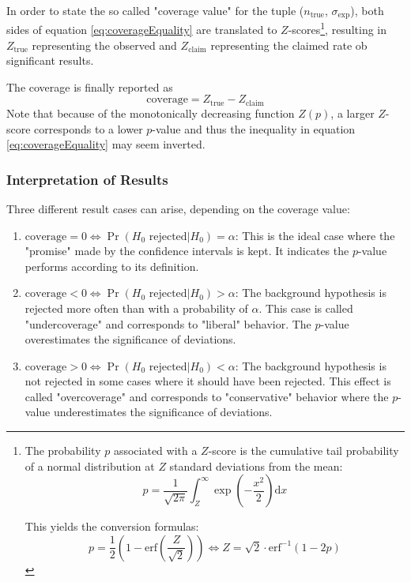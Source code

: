 In order to state the so called "coverage value" for the tuple ($n_\text{true}$, $\sigma_\text{exp}$), both sides of equation \ref{eq:coverageEquality} are translated to $Z$-scores\footnote{	
	The probability $p$ associated with a $Z$-score is the cumulative tail probability of a normal distribution at $Z$ standard deviations from the mean:
	\begin{equation}
	p = \frac{1}{\sqrt{2 \pi}}\int_Z^{\infty} \exp\left(-\frac{x^2}{2}\right) \text{d}x
	\end{equation}
	
	This yields the conversion formulas:
	\begin{equation}
	p = \frac{1}{2} \left(1 - \text{erf}\left(\frac{Z}{\sqrt{2}}\right) \right) \Leftrightarrow Z = \sqrt{2} \cdot \text{erf}^{-1} \left( 1 - 2 p \right) 
	\end{equation}
}, resulting in $Z_\text{true}$ representing the observed and $Z_\text{claim}$ representing the claimed rate ob significant results.

The coverage is finally reported as
\begin{equation}
	\text{coverage} = Z_\text{true} - Z_\text{claim}
\end{equation}
Note that because of the monotonically decreasing function $Z(p)$, a larger $Z$-score corresponds to a lower $p$-value and thus the inequality in equation \ref{eq:coverageEquality} may seem inverted.

\subsubsection{Interpretation of Results}
Three different result cases can arise, depending on the coverage value:
\begin{enumerate}
	\item $\text{coverage} = 0 \Leftrightarrow \Pr( H_0 \text{ rejected} | H_0 ) = \alpha$: This is the ideal case where the "promise" made by the confidence intervals is kept. It indicates the $p$-value performs according to its definition.
	\item $\text{coverage} < 0 \Leftrightarrow \Pr( H_0 \text{ rejected} | H_0 ) > \alpha$: The background hypothesis is rejected more often than with a probability of $\alpha$. This case is called "undercoverage" and corresponds to "liberal" behavior. The $p$-value overestimates the significance of deviations.
	\item $\text{coverage} > 0 \Leftrightarrow \Pr( H_0 \text{ rejected} | H_0 ) < \alpha$: The background hypothesis is not rejected in some cases where it should have been rejected. This effect is called "overcoverage" and corresponds to "conservative" behavior where the $p$-value underestimates the significance of deviations.
\end{enumerate}	

